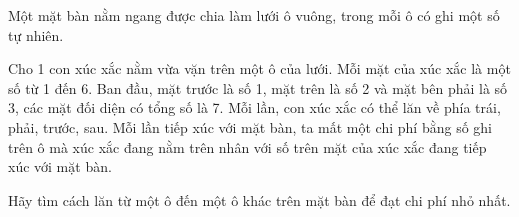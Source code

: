 Một mặt bàn nằm ngang được chia làm lưới ô vuông, trong mỗi ô có ghi một số tự nhiên.  

   Cho 1 con xúc xắc nằm vừa vặn trên một ô của lưới. Mỗi mặt của xúc xắc là một số từ 1 đến 6. Ban đầu, mặt trước là số 1, mặt trên là số 2 và mặt bên phải là số 3, các mặt đối diện có tổng số là 7. Mỗi lần, con xúc xắc có thể lăn về phía trái, phải, trước, sau. Mỗi lần tiếp xúc với mặt bàn, ta mất một chi phí bằng số ghi trên ô mà xúc xắc đang nằm trên nhân với số trên mặt của xúc xắc đang tiếp xúc với mặt bàn.  

   Hãy tìm cách lăn từ một ô đến một ô khác trên mặt bàn để đạt chi phí nhỏ nhất.